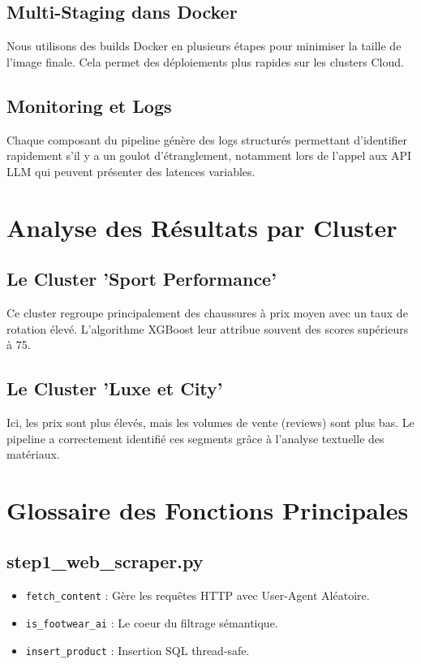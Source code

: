 \documentclass[11pt,a4paper,oneside]{report}
\begin{document}
    \section{Multi-Staging dans Docker}
    Nous utilisons des builds Docker en plusieurs étapes pour minimiser la taille de l'image finale. Cela permet des déploiements plus rapides sur les clusters Cloud.

    \section{Monitoring et Logs}
    Chaque composant du pipeline génère des logs structurés permettant d'identifier rapidement s'il y a un goulot d'étranglement, notamment lors de l'appel aux API LLM qui peuvent présenter des latences variables.

    \chapter{Analyse des Résultats par Cluster}
    \section{Le Cluster 'Sport Performance'}
    Ce cluster regroupe principalement des chaussures à prix moyen avec un taux de rotation élevé. L'algorithme XGBoost leur attribue souvent des scores supérieurs à 75.

    \section{Le Cluster 'Luxe et City'}
    Ici, les prix sont plus élevés, mais les volumes de vente (reviews) sont plus bas. Le pipeline a correctement identifié ces segments grâce à l'analyse textuelle des matériaux.

    \chapter{Glossaire des Fonctions Principales}
    \section{step1\_web\_scraper.py}
    \begin{itemize}
        \item \texttt{fetch\_content} : Gère les requêtes HTTP avec User-Agent Aléatoire.
        \item \texttt{is\_footwear\_ai} : Le coeur du filtrage sémantique.
        \item \texttt{insert\_product} : Insertion SQL thread-safe.
    \end{itemize}
\end{document}
